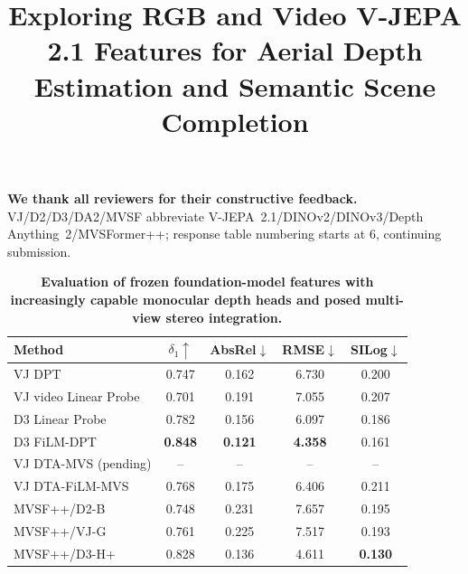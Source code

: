 \documentclass[10pt,twocolumn,letterpaper]{article}
\begin{document}
\title{Exploring RGB and Video V-JEPA 2.1 Features for Aerial Depth Estimation and Semantic Scene Completion}
\maketitle
\thispagestyle{empty}
\appendix

\noindent\textbf{We thank all reviewers for their constructive feedback.}
VJ/D2/D3/DA2/MVSF abbreviate V-JEPA~2.1/DINOv2/DINOv3/Depth Anything~2/MVSFormer++;
response table numbering starts at 6, continuing submission.
\begin{table}[t]
  \centering
  \caption{\textbf{Evaluation of frozen foundation-model features with increasingly capable monocular depth heads and posed multi-view stereo integration.}}
  \label{tab:depth_evaluation}
  \footnotesize
  \setlength{\tabcolsep}{2.5pt}
  \begin{tabular}{@{}lcccc@{}}
    \toprule
    Method & $\delta_1\uparrow$ & AbsRel$\downarrow$ & RMSE$\downarrow$ & SILog$\downarrow$ \\
    \midrule
    VJ DPT          & 0.747 & 0.162 & 6.730 & 0.200 \\
    VJ video Linear Probe              & 0.701 & 0.191 & 7.055 & 0.207 \\
    D3 Linear Probe                    & 0.782 & 0.156 & 6.097 & 0.186 \\
    D3 FiLM-DPT              & \textbf{0.848} & \textbf{0.121} & \textbf{4.358} & 0.161 \\
    VJ DTA-MVS (pending)     & -- & -- & -- & -- \\
    VJ DTA-FiLM-MVS          & 0.768 & 0.175 & 6.406 & 0.211 \\
    MVSF++/D2-B             & 0.748 & 0.231 & 7.657 & 0.195 \\
    MVSF++/VJ-G             & 0.761 & 0.225 & 7.517 & 0.193 \\
    MVSF++/D3-H+            & 0.828 & 0.136 & 4.611 & \textbf{0.130} \\
    \bottomrule
  \end{tabular}
\end{table}
\end{document}
